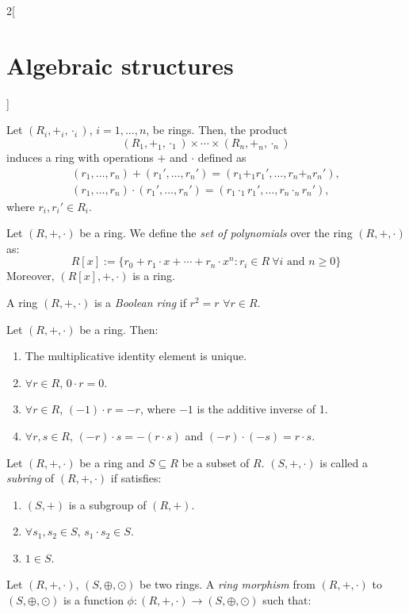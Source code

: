 \documentclass[../../../main_math.tex]{subfiles}
\begin{document}
\begin{multicols}{2}[\section{Algebraic structures}]
\begin{proposition}
    Let $(R_i,+_i,\cdot_i)$, $i=1,\ldots, n$, be rings. Then, the product $$(R_1,+_1,\cdot_1)\times\cdots\times(R_n,+_n,\cdot_n)$$ induces a ring with operations $+$ and $\cdot$ defined as
    \begin{gather*}
      (r_1,\ldots,r_n)+(r_1',\ldots,r_n')=(r_1+_1r_1',\ldots,r_n+_nr_n'),\\
      (r_1,\ldots,r_n)\cdot(r_1',\ldots,r_n')=(r_1\cdot_1r_1',\ldots,r_n\cdot_nr_n'),
    \end{gather*}
    where $r_i,r_i'\in R_i$.
  \end{proposition}
  \begin{definition}
    Let $(R,+,\cdot)$ be a ring. We define the  \emph{set of polynomials} over the ring $(R,+,\cdot)$ as: $$R[x]:=\{r_0+r_1\cdot x+\cdots+r_n\cdot x^n:r_i\in R\ \forall i\text{ and }n\geq 0\}$$ Moreover, $(R[x],+,\cdot)$ is a ring.
  \end{definition}
  \begin{definition}
    A ring $(R,+,\cdot)$ is a \emph{Boolean ring} if $r^2=r$ $\forall r\in R$.
  \end{definition}
  \begin{lemma}
    Let $(R,+,\cdot)$ be a ring. Then:
    \begin{enumerate}
      \item The multiplicative identity element is unique.
      \item $\forall r\in R$, $0\cdot r=0$.
      \item $\forall r\in R$, $(-1)\cdot r=-r$, where $-1$ is the additive inverse of 1.
      \item $\forall r,s\in R$, $(-r)\cdot s=-(r\cdot s)$ and $(-r)\cdot (-s)=r\cdot s$.
    \end{enumerate}
  \end{lemma}
  \begin{definition}[Subring]
    Let $(R,+,\cdot)$ be a ring and $S\subseteq R$ be a subset of $R$. $(S,+,\cdot)$ is called a \emph{subring} of $(R,+,\cdot)$ if satisfies:
    \begin{enumerate}
      \item $(S,+)$ is a subgroup of $(R,+)$.
      \item $\forall s_1,s_2\in S$, $s_1\cdot s_2\in S$.
      \item $1\in S$.
    \end{enumerate}
  \end{definition}
  \begin{definition}
    Let $(R,+,\cdot)$, $(S,\oplus,\odot)$ be two rings. A \emph{ring morphism} from $(R,+,\cdot)$ to $(S,\oplus,\odot)$ is a function $\phi:(R,+,\cdot)\rightarrow (S,\oplus,\odot)$ such that:

\end{definition}
\end{multicols}
\end{document}
